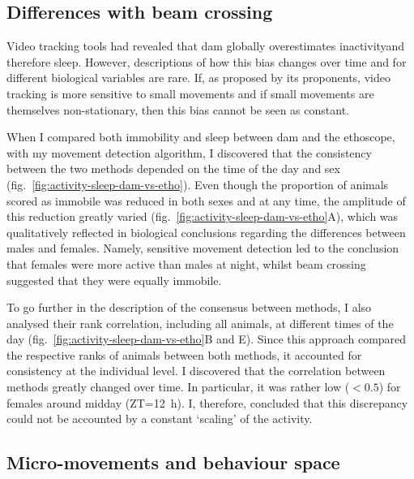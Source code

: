 \subsection{Differences with beam crossing}
Video tracking tools had revealed that \gls{dam} globally overestimates inactivity\emd{}and therefore sleep\cite{gilestro_pysolo_2009, faville_how_2015}.
However, descriptions of how this bias changes over time and for different biological variables are rare\cite{garbe_context-specific_2015}.
If, as proposed by its proponents, video tracking is more sensitive to small movements and if small movements are themselves non-stationary, then this bias cannot be seen as constant.

When I compared both immobility and sleep between \gls{dam} and the ethoscope, with my movement detection algorithm, I discovered that the consistency between the two methods depended on the time of the day and sex (fig.~\ref{fig:activity-sleep-dam-vs-etho}).
Even though the proportion of animals scored as immobile was reduced in both sexes and at any time, the amplitude of this reduction greatly varied (fig.~\ref{fig:activity-sleep-dam-vs-etho}A), which was qualitatively  reflected in biological conclusions regarding the differences between males and females.
Namely, sensitive movement detection led to the conclusion that females were more active than males at night, whilst beam crossing suggested that they were equally immobile.
 
To go further in the description of the consensus between methods, I also analysed their rank correlation, including all animals, at different times of the day (fig.~\ref{fig:activity-sleep-dam-vs-etho}B and E).
Since this approach compared the respective ranks of animals between both methods, it accounted for consistency at the individual level.
I discovered that the correlation between methods greatly changed over time. 
In particular, it was rather low ($<0.5$) for females around midday (ZT=12~h).
I, therefore, concluded that this discrepancy could not be accounted by a constant `scaling' of the activity.

\subsection{Micro-movements and behaviour space}

